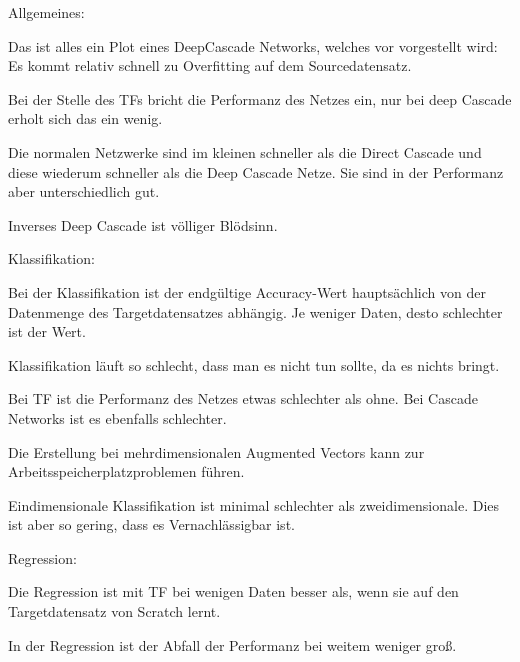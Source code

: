 Allgemeines:

Das ist alles ein Plot eines DeepCascade Networks, welches vor vorgestellt wird:
Es kommt relativ schnell zu Overfitting auf dem Sourcedatensatz. %

Bei der Stelle des TFs bricht die Performanz des Netzes ein, nur bei deep Cascade erholt sich das ein wenig. 


Die normalen Netzwerke sind im kleinen schneller als die Direct Cascade und diese wiederum schneller als die Deep Cascade Netze. 
Sie sind in der Performanz aber unterschiedlich gut. 

Inverses Deep Cascade ist völliger Blödsinn. \newline

Klassifikation: 

Bei der Klassifikation ist der endgültige Accuracy-Wert hauptsächlich von der Datenmenge des Targetdatensatzes abhängig. 
Je weniger Daten, desto schlechter ist der Wert. %

Klassifikation läuft so schlecht, dass man es nicht tun sollte, da es nichts bringt. %

Bei TF ist die Performanz des Netzes etwas schlechter als ohne. %
Bei Cascade Networks ist es ebenfalls schlechter. %


Die Erstellung bei mehrdimensionalen Augmented Vectors kann zur Arbeitsspeicherplatzproblemen führen. %

Eindimensionale Klassifikation ist minimal schlechter als zweidimensionale. Dies ist aber so gering, dass es Vernachlässigbar ist. \newline

Regression:

Die Regression ist mit TF bei wenigen Daten besser als, wenn sie auf den Targetdatensatz von Scratch lernt. %


In der Regression ist der Abfall der Performanz bei weitem weniger groß. %

